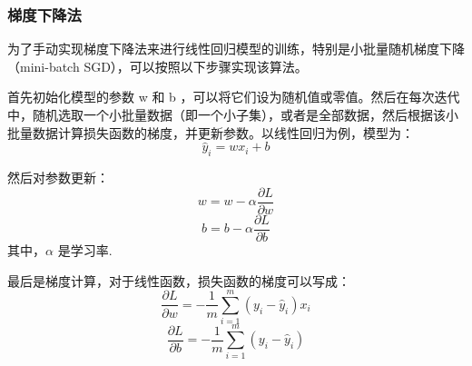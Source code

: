 \documentclass[12pt,a4paper,oneside]{article}
\begin{document}
\subsubsection{梯度下降法}
为了手动实现梯度下降法来进行线性回归模型的训练，特别是小批量随机梯度下降（mini-batch SGD），可以按照以下步骤实现该算法。

首先初始化模型的参数  w  和  b ，可以将它们设为随机值或零值。然后在每次迭代中，随机选取一个小批量数据（即一个小子集），或者是全部数据，然后根据该小批量数据计算损失函数的梯度，并更新参数。以线性回归为例，模型为：
\begin{equation}
    \hat{y}_i = w x_i + b
\end{equation}

然后对参数更新：
\begin{equation}
    w = w - \alpha \frac{\partial L}{\partial w}
\end{equation}
\begin{equation}
    b = b - \alpha \frac{\partial L}{\partial b}
\end{equation}
其中，$\alpha$ 是学习率.

最后是梯度计算，对于线性函数，损失函数的梯度可以写成：
\begin{equation}
    \frac{\partial L}{\partial w} = - \frac{1}{m} \sum_{i=1}^{m} (y_i - \hat{y}_i) x_i
\end{equation}
\begin{equation}
    \frac{\partial L}{\partial b} = - \frac{1}{m} \sum_{i=1}^{m} (y_i - \hat{y}_i)
\end{equation}
\end{document}
